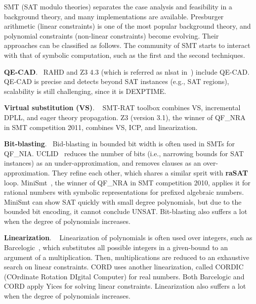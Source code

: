\documentclass[runningheads,a4paper,oribibl]{llncs}
\newcommand{\mizuhito}[1]{\{{\bf Mizuhito:~\sf #1}\}} %
\begin{document}
SMT (SAT modulo theories) separates the case analysis and feasibility in a background theory, 
and many implementations are available. 
Presburger arithmetic (linear constraints) is one of the most popular background theory, and 
polynomial constraints (non-linear constraints) become evolving. 
Their approaches can be classified as follows. 
The community of SMT starts to interact with that of symbolic computation, 
such as the first and the second techniques. 

\medskip \noindent
\textbf{QE-CAD}. ~RAHD \cite{rahd} and 
Z3 4.3 (which is referred as nlsat in~\cite{Jovanovic13}) include QE-CAD. 
QE-CAD is precise and detects beyond SAT instances (e.g., SAT regions), 
scalability is still challenging, since it is DEXPTIME. 

\medskip \noindent
\textbf{Virtual substitution (VS)}. ~
SMT-RAT toolbox \cite{smtrat}\cite{vssmt} combines 
VS, incremental DPLL, and %
eager theory propagation. 
Z3 (version 3.1), the winner of QF\_NRA in SMT competition 2011, 
combines VS, ICP, and linearization.

\medskip \noindent
\textbf{Bit-blasting}. ~Bid-blasting in bounded bit width is often used in SMTs for QF\_NIA. 
UCLID~\cite{uclid} reduces the number of bits (i.e., narrowing bounds for SAT instances) 
as an under-approximation, and removes clauses as an over-approximation. 
They refine each other, which shares a similar sprit with {\bf raSAT} loop. 
MiniSmt~\cite{minismt}, the winner of QF\_NRA in SMT competition 2010, 
applies it for rational numbers with symbolic representations for prefixed algebraic numbers. 
MiniSmt can show SAT quickly with small degree polynomials, but due to the bounded bit encoding, 
it cannot conclude UNSAT.
Bit-blasting also suffers a lot when the degree of polynomials increases. 

\medskip \noindent
\textbf{Linearization}. ~
Linearization of polynomials is often used over integers, such as Barcelogic~\cite{barce}, 
which substitutes all possible integers in a given-bound to an argument of a multiplication. 
Then, multiplications are reduced to an exhaustive search on linear constraints. 
CORD \cite{cord} uses another linearization, called 
CORDIC (COrdinate Rotation DIgital Computer) for real numbers. 
Both Barcelogic and CORD apply Yices for solving linear constraints.
Linearization also suffers a lot when the degree of polynomials increases. 
\end{document}
